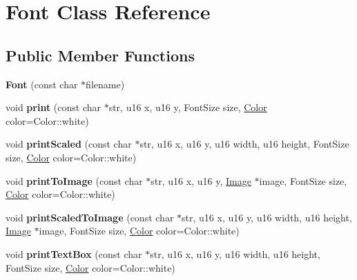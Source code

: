 \hypertarget{classFont}{\section{Font Class Reference}
\label{classFont}
}
\subsection*{Public Member Functions}
\begin{DoxyCompactItemize}
\item 
\hypertarget{classFont_af070a503adc8786a2001364db13d1530}{{\bfseries Font} (const char $\ast$filename)}\label{classFont_af070a503adc8786a2001364db13d1530}

\item 
\hypertarget{classFont_a4aaa4551e870bd2fe37e784bd0c50eb4}{void {\bfseries print} (const char $\ast$str, u16 x, u16 y, Font\-Size size, \hyperlink{classColor}{Color} color=Color\-::white)}\label{classFont_a4aaa4551e870bd2fe37e784bd0c50eb4}

\item 
\hypertarget{classFont_a77ed96a1042b358547110d767ca82c9d}{void {\bfseries print\-Scaled} (const char $\ast$str, u16 x, u16 y, u16 width, u16 height, Font\-Size size, \hyperlink{classColor}{Color} color=Color\-::white)}\label{classFont_a77ed96a1042b358547110d767ca82c9d}

\item 
\hypertarget{classFont_ac3649951a4019d1971631e93cacfa012}{void {\bfseries print\-To\-Image} (const char $\ast$str, u16 x, u16 y, \hyperlink{classImage}{Image} $\ast$image, Font\-Size size, \hyperlink{classColor}{Color} color=Color\-::white)}\label{classFont_ac3649951a4019d1971631e93cacfa012}

\item 
\hypertarget{classFont_ac2c1168412d5663f700e341cf813f51e}{void {\bfseries print\-Scaled\-To\-Image} (const char $\ast$str, u16 x, u16 y, u16 width, u16 height, \hyperlink{classImage}{Image} $\ast$image, Font\-Size size, \hyperlink{classColor}{Color} color=Color\-::white)}\label{classFont_ac2c1168412d5663f700e341cf813f51e}

\item 
\hypertarget{classFont_a71b99aa7706cbc7d4fce7cf3b3caef7b}{void {\bfseries print\-Text\-Box} (const char $\ast$str, u16 x, u16 y, u16 width, u16 height, Font\-Size size, \hyperlink{classColor}{Color} color=Color\-::white)}\label{classFont_a71b99aa7706cbc7d4fce7cf3b3caef7b}


\end{DoxyCompactItemize}
